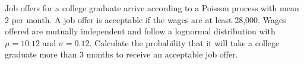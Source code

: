  Job offers for a college graduate arrive according to a Poisson process with mean 2 per
month. A job offer is acceptable if the wages are at least 28,000. Wages offered are
mutually independent and follow a lognormal distribution with $\mu=10.12$ and $\sigma=0.12$. 
Calculate the probability that it will take a college graduate more than 3 months to
receive an acceptable job offer.

